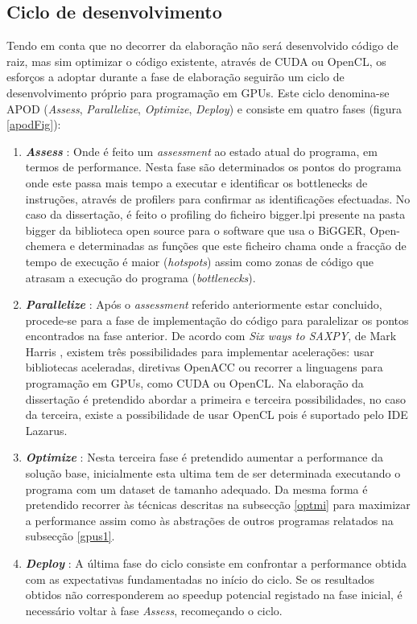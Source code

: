 \subsection{Ciclo de desenvolvimento}
Tendo em conta que no decorrer da elaboração não será desenvolvido código de raiz, mas sim optimizar o código existente, através de CUDA ou OpenCL, os esforços a adoptar durante a fase de elaboração seguirão um ciclo de desenvolvimento próprio para programação em GPUs. Este ciclo denomina-se APOD (\textit{Assess}, \textit{Parallelize}, \textit{Optimize}, \textit{Deploy}) \cite{cudaProgGuide} e consiste em quatro fases (figura \ref{apodFig}):
\begin{enumerate}
\item {\textbf{\textit{Assess}}} : Onde é feito um \textit{assessment} ao estado atual do programa, em termos de performance. Nesta fase são determinados os pontos do programa onde este passa mais tempo a executar e identificar os bottlenecks de instruções, através de profilers para confirmar as identificações efectuadas. No caso da dissertação, é feito o profiling do ficheiro bigger.lpi presente na pasta bigger da biblioteca open source para o software que usa o BiGGER, Open-chemera e determinadas as funções que este ficheiro chama onde a fracção de tempo de execução é maior (\textit{hotspots}) assim como zonas de código que atrasam a execução do programa (\textit{bottlenecks}). 

\item{\textbf{\textit{ Parallelize}}} : Após o \textit{assessment}  referido anteriormente estar concluido, procede-se para a fase de implementação do código para paralelizar os pontos encontrados na fase anterior. De acordo com \textit{Six ways to SAXPY}, de Mark Harris  \cite{saxpy}, existem três possibilidades para implementar acelerações: usar bibliotecas aceleradas, diretivas OpenACC ou recorrer a linguagens para programação em GPUs, como CUDA ou OpenCL. Na elaboração da dissertação é pretendido abordar a primeira e terceira possibilidades, no caso da terceira, existe a possibilidade de usar OpenCL pois é suportado pelo IDE Lazarus.

\item{\textbf{\textit{Optimize}}} : Nesta terceira fase é pretendido aumentar a performance da solução base, inicialmente esta ultima tem de ser determinada executando o programa com um dataset de tamanho adequado. Da mesma forma é pretendido recorrer às técnicas descritas na subsecção \ref{optmi} para maximizar a performance assim como às abstrações de outros programas relatados na subsecção \ref{gpus1}.

\item{\textbf{\textit{Deploy}}} : A última fase do ciclo consiste em confrontar a performance obtida com as expectativas fundamentadas no início do ciclo. Se os resultados obtidos não corresponderem ao speedup potencial registado na fase inicial, é necessário voltar à fase \textit{Assess}, recomeçando o ciclo.
\end{enumerate}


